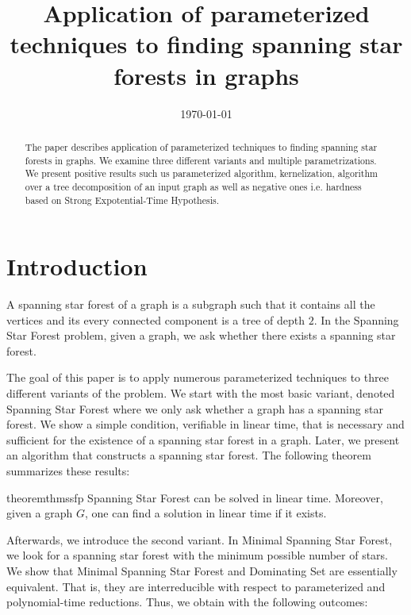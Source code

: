 \documentclass[en]{pracamgr}
\title{Application of parameterized techniques to finding spanning star forests in graphs}
\date{\monthyeardate\today}
\theoremstyle{definition}
\newcommand{\ssfp}{{\sc Spanning Star Forest}}
\newcommand{\mssfp}{{\sc Minimal Spanning Star Forest}}
\newcommand{\domsetp}{{\sc Dominating Set}}
\begin{document}
\maketitle

\begin{abstract}
	The paper describes application of parameterized techniques to finding spanning star forests in graphs. We examine three different variants and multiple parametrizations. We present positive results such us parameterized algorithm, kernelization, algorithm over a tree decomposition of an input graph as well as negative ones i.e. hardness based on Strong Expotential-Time Hypothesis.
\end{abstract}

\tableofcontents

\chapter{Introduction}

A spanning star forest of a graph is a subgraph such that it contains all the vertices and its every connected component is a tree of depth $2$. In the \ssfp{} problem, given a graph, we ask whether there exists a spanning star forest. 

The goal of this paper is to apply numerous parameterized techniques to three different variants of the problem. We start with the most basic variant, denoted \ssfp{} where we only ask whether a graph has a spanning star forest. We show a simple condition, verifiable in linear time, that is necessary and sufficient for the existence of a spanning star forest in a graph. Later, we present an algorithm that constructs a spanning star forest. The following theorem summarizes these results:

\begin{restatable}{theorem}{thmssfp}\label{thm-ssfp}
	\ssfp{} can be solved in linear time. Moreover, given a graph $G$, one can find a solution in linear time if it exists.
\end{restatable}

Afterwards, we introduce the second variant. In \mssfp{}, we look for a spanning star forest with the minimum possible number of stars. We show that \mssfp{} and \domsetp{} are essentially equivalent. That is, they are interreducible with respect to parameterized and polynomial-time reductions. Thus, we obtain with the following outcomes:
\end{document}
